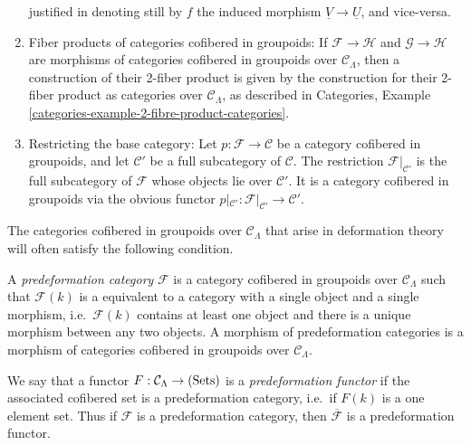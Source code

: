 \begin{remarks}
\begin{enumerate}
justified in denoting still by $f$ the induced morphism $\underline{V} 
\rightarrow \underline{U}$, and vice-versa.
\item Fiber products of categories cofibered in groupoids: If $\mathcal F 
\rightarrow \mathcal H$ and $\mathcal G \rightarrow \mathcal H$ are morphisms 
of categories cofibered in groupoids over $\mathcal C_{\Lambda}$, then a 
construction of their 2-fiber product is given by the construction for their 
2-fiber product as categories over $\mathcal C_{\Lambda}$, as described in 
Categories, Example \ref{categories-example-2-fibre-product-categories}.
\item 
\label{definition-restricting-base-category}
Restricting the base category: Let $p : \mathcal F \rightarrow \mathcal C$ be a 
category cofibered in groupoids, and let $\mathcal C'$ be a full subcategory of 
$\mathcal C$.  The restriction $\mathcal F|_{\mathcal C'}$ is the full 
subcategory of $\mathcal F$ whose objects lie over $\mathcal C'$. It is a 
category cofibered in groupoids via the obvious functor $p|_{\mathcal C'}: 
\mathcal F|_{\mathcal C'} \rightarrow \mathcal C'$.
\end{enumerate}
\end{remarks}

\noindent
The categories cofibered in groupoids over $\mathcal C_{\Lambda}$ that arise in 
deformation theory will often satisfy the following condition.

\begin{definition}
\label{definition-predeformation-category}
A {\it predeformation category} $\mathcal F$ is a category cofibered in 
groupoids over $\mathcal C_{\Lambda}$ such that $\mathcal F(k)$ is a equivalent 
to a category with a single object and a single morphism, i.e.\ $\mathcal F(k)$ 
contains at least one object and there is a unique morphism between any two 
objects. A morphism of predeformation categories is a morphism of categories 
cofibered in groupoids over $\mathcal C_{\Lambda}$.
\end{definition}

\begin{remark}
\label{remark-predeformation-functor}
We say that a functor $F: \mathcal C_{\Lambda} \rightarrow \textnormal{(Sets)}$ 
is a {\it predeformation functor} if the associated cofibered set is a 
predeformation category, i.e.\ if $F(k)$ is a one element set.  Thus if 
$\mathcal F$ is a predeformation category, then $\overline{\mathcal F}$ is a 
predeformation functor.
\end{remark}


